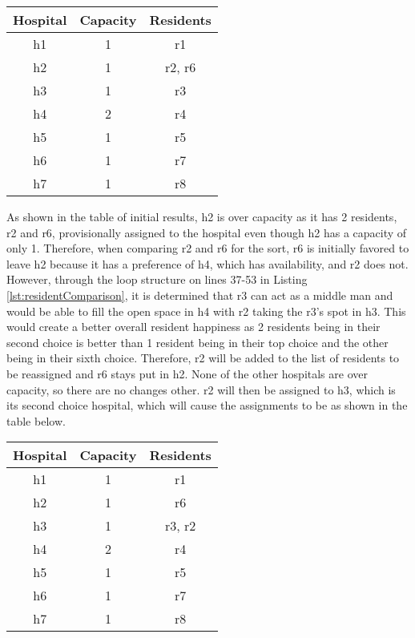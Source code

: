 \documentclass[letterpaper, 10pt,DIV=13]{scrartcl}
\numberwithin{equation}{section} %
\numberwithin{figure}{section} %
\numberwithin{table}{section} %
\begin{document}
\begin{center}
  \begin{tabular}{|c|c|c|}
    \hline
    Hospital & Capacity & Residents \\
    \hline
    h1 & 1 & r1 \\
    \hline
    h2 & 1 & r2, r6 \\
    \hline
    h3 & 1 & r3 \\
    \hline
    h4 & 2 & r4 \\
    \hline
    h5 & 1 & r5 \\
    \hline
    h6 & 1 & r7 \\
    \hline
    h7 & 1 & r8 \\
    \hline
  \end{tabular}
\end{center}

As shown in the table of initial results, h2 is over capacity as it has 2 residents, r2 and r6, provisionally assigned to the hospital even though h2 has a capacity of only 1. Therefore, when comparing r2 and r6 for the sort, r6 is initially favored to leave h2 because it has a preference of h4, which has availability, and r2 does not. However, through the loop structure on lines 37-53 in Listing \ref{lst:residentComparison}, it is determined that r3 can act as a middle man and would be able to fill the open space in h4 with r2 taking the r3's spot in h3. This would create a better overall resident happiness as 2 residents being in their second choice is better than 1 resident being in their top choice and the other being in their sixth choice. Therefore, r2 will be added to the list of residents to be reassigned and r6 stays put in h2. None of the other hospitals are over capacity, so there are no changes other. r2 will then be assigned to h3, which is its second choice hospital, which will cause the assignments to be as shown in the table below.

\begin{center}
  \begin{tabular}{|c|c|c|}
    \hline
    Hospital & Capacity & Residents \\
    \hline
    h1 & 1 & r1 \\
    \hline
    h2 & 1 & r6 \\
    \hline
    h3 & 1 & r3, r2 \\
    \hline
    h4 & 2 & r4 \\
    \hline
    h5 & 1 & r5 \\
    \hline
    h6 & 1 & r7 \\
    \hline
    h7 & 1 & r8 \\
    \hline
  \end{tabular}
\end{center}
\end{document}
